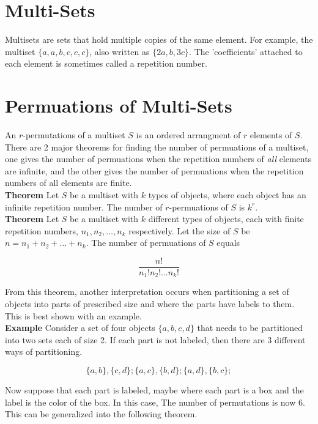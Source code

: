 \documentclass[12pt, letterpaper]{article}
\begin{document}
\section*{Multi-Sets}
Multisets are sets that hold multiple copies of the same element. For example, 
the multiset \(\{a, a, b, c, c, c\}\), also written as \(\{2a, b ,3c\}\). The 
'coefficients' attached to each element is sometimes called a repetition number. 

\section*{Permuations of Multi-Sets}

\noindent 
An \(r\)-permutations of a multiset \(S\) is an ordered arrangment of \(r\) elements of \(S\). 
There are 2 major theorems for finding the number of permuations of a multiset,
one gives the number of permuations when the repetition numbers of \textit{all} elements are infinite, 
and the other gives the number of permuations when the repetition numbers of all elements are finite. \\

\noindent
\textbf{Theorem} Let \(S\) be a multiset with \(k\) types of objects, where each object has an infinite repetition number.
The number of \(r\)-permuations of \(S\) is \(k^r\). \\

\noindent 
\textbf{Theorem} Let \(S\) be a multiset with \(k\) different types of objects, each with finite repetition numbers,
\(n_1,n_2,\dots, n_k\) respectively. Let the size of \(S\) be \(n = n_1 + n_2 + \dots + n_k\).
The number of permuations of \(S\) equals 

\[
  \frac{n!}{n_1! n_2! \dots n_k!}
\]

From this theorem, another interpretation occurs when partitioning a set of objects into parts of 
prescribed size and where the parts have labels to them. This is best shown with an example. \\ 

\noindent
\textbf{Example} Consider a set of four objects \(\{a, b, c, d\}\) that needs to be partitioned into two sets each of size 2.
If each part is not labeled, then there are 3 different ways of partitioning. 

\[
  \{a, b\}, \{c, d\}; \{a, c\}, \{b, d\}; \{a, d\}, \{b, c\};
\]

Now suppose that each part is labeled, maybe where each part is a box and the label is the color of the box. In this case,
The number of permutations is now 6. This can be generalized into the following theorem.
\end{document}

